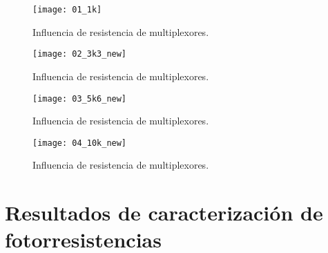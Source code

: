             \begin{figure}[hbtp]
                \centering
                \texttt{[image: 01\_1k]}
                \caption{Influencia de resistencia de multiplexores.}
                \label{fig:01_1k}
            \end{figure}  
            
            \begin{figure}[hbtp]
                \centering
                \texttt{[image: 02\_3k3\_new]}
                \caption{Influencia de resistencia de multiplexores.}
                \label{fig:02_3k3_new}
            \end{figure}              
 
            \begin{figure}[hbtp]
                \centering
                \texttt{[image: 03\_5k6\_new]}
                \caption{Influencia de resistencia de multiplexores.}
                \label{fig:03_5k6_new}
            \end{figure}   

            \begin{figure}[hbtp]
                \centering
                \texttt{[image: 04\_10k\_new]}
                \caption{Influencia de resistencia de multiplexores.}
                \label{fig:04_10k_new}
            \end{figure}  
                
                     
\section{Resultados de caracterización de fotorresistencias}


